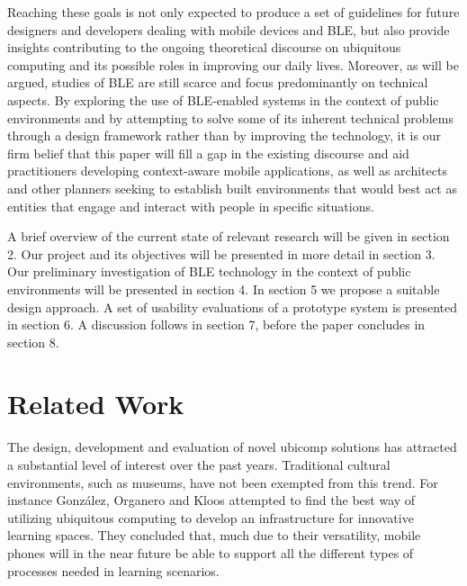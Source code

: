 \documentclass[prodmode,acmtomm]{acmsmall}
\begin{document}
Reaching these goals is not only expected to produce a set of guidelines for future designers and developers dealing with mobile devices and BLE, but also provide insights contributing to the ongoing theoretical discourse on ubiquitous computing and its possible roles in improving our daily lives. Moreover, as will be argued, studies of BLE are still scarce and focus predominantly on technical aspects. By exploring the use of BLE-enabled systems in the context of public environments and by attempting to solve some of its inherent technical problems through a design framework rather than by improving the technology, it is our firm belief that this paper will fill a gap in the existing discourse and aid practitioners developing context-aware mobile applications, as well as architects and other planners seeking to establish built environments that would best act as entities that engage and interact with people in specific situations. 

A brief overview of the current state of relevant research will be given in section 2. Our project and its objectives will be presented in more detail in section 3. Our preliminary investigation of BLE technology in the context of public environments will be presented in section 4. In section 5 we propose a suitable design approach. A set of usability evaluations of a prototype system is presented in section 6. A discussion follows in section 7, before the paper concludes in section 8. 

\section{Related Work}
The design, development and evaluation of novel ubicomp solutions has attracted a substantial level of interest over the past years. Traditional cultural environments, such as museums, have not been exempted from this trend. \cite{jacobs2015} \cite{vancat2012} For instance Gonz{\'a}lez, Organero and Kloos \cite{gonzales2008} attempted to find the best way of utilizing ubiquitous computing to develop an infrastructure for innovative learning spaces. They concluded that, much due to their versatility, mobile phones will in the near future be able to support all the different types of processes needed in learning scenarios.
\end{document}
